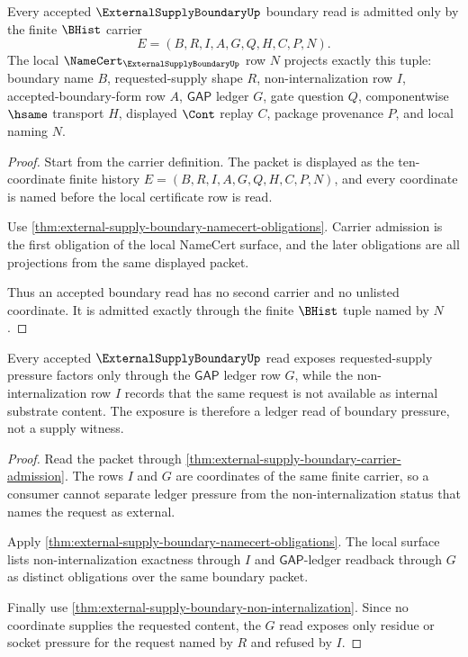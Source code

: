 \begin{theorem}
\label{thm:external-supply-boundary-carrier-admission}
Every accepted $\ExternalSupplyBoundaryUp$ boundary read is admitted only by the
finite $\BHist$ carrier
$$
E=(B,R,I,A,G,Q,H,C,P,N).
$$
The local $\NameCert_{\ExternalSupplyBoundaryUp}$ row $N$ projects exactly this
tuple: boundary name $B$, requested-supply shape $R$, non-internalization row
$I$, accepted-boundary-form row $A$, $\mathsf{GAP}$ ledger $G$, gate question
$Q$, componentwise $\hsame$ transport $H$, displayed $\Cont$ replay $C$,
package provenance $P$, and local naming $N$.
\end{theorem}
\begin{proof}
Start from the carrier definition. The packet is displayed as the ten-coordinate
finite history $E=(B,R,I,A,G,Q,H,C,P,N)$, and every coordinate is named before
the local certificate row is read.

Use \autoref{thm:external-supply-boundary-namecert-obligations}. Carrier
admission is the first obligation of the local NameCert surface, and the later
obligations are all projections from the same displayed packet.

Thus an accepted boundary read has no second carrier and no unlisted coordinate.
It is admitted exactly through the finite $\BHist$ tuple named by $N$.
\end{proof}

\begin{theorem}
\label{thm:external-supply-boundary-gap-ledger-exposure}
Every accepted $\ExternalSupplyBoundaryUp$ read exposes requested-supply
pressure factors only through the $\mathsf{GAP}$ ledger row $G$, while the
non-internalization row $I$ records that the same request is not available as
internal substrate content. The exposure is therefore a ledger read of boundary
pressure, not a supply witness.
\end{theorem}
\begin{proof}
Read the packet through \autoref{thm:external-supply-boundary-carrier-admission}.
The rows $I$ and $G$ are coordinates of the same finite carrier, so a consumer
cannot separate ledger pressure from the non-internalization status that names
the request as external.

Apply \autoref{thm:external-supply-boundary-namecert-obligations}. The local
surface lists non-internalization exactness through $I$ and
$\mathsf{GAP}$-ledger readback through $G$ as distinct obligations over the same
boundary packet.

Finally use \autoref{thm:external-supply-boundary-non-internalization}. Since no
coordinate supplies the requested content, the $G$ read exposes only residue or
socket pressure for the request named by $R$ and refused by $I$.
\end{proof}

